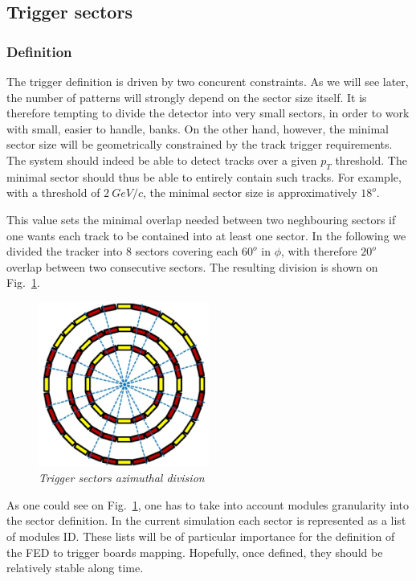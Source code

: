 \subsection{Trigger sectors}

\subsubsection{Definition}

\noindent The trigger definition is driven by two concurent constraints. As we will see later, the number of patterns will strongly depend on the sector size itself. It is therefore tempting to divide the detector into very small sectors, in order to work with small, easier to handle, banks. On the other hand, however, the minimal sector size will be geometrically constrained by the track trigger requirements. The system should indeed be able to detect tracks over a given $p_T$ threshold. The minimal sector should thus be able to entirely contain such tracks. For example, with a threshold of $2~GeV/c$, the minimal sector size is approximatively $18^{o}$.

\noindent This value sets the minimal overlap needed between two neghbouring sectors if one wants each track to be contained into at least one sector. In the following we divided the tracker into 8 sectors covering each $60^{o}$ in $\phi$, with therefore $20^{o}$ overlap between two consecutive sectors. The resulting division is shown on Fig.~\ref{fig:SEC_PHI}.

\begin{figure}[ht!]
\centering
\includegraphics[width=0.5\textwidth]{Plots/AzimuthCut.eps}
\caption{\emph{Trigger sectors azimuthal division}}
\label{fig:SEC_PHI}
\end{figure} 

\noindent As one could see on Fig.~\ref{fig:SEC_PHI}, one has to take into account modules granularity into the sector definition. In the current simulation each sector is represented as a list of modules ID. These lists will be of particular importance for the definition of the FED to trigger boards mapping. Hopefully, once defined, they should be relatively stable along time. 

